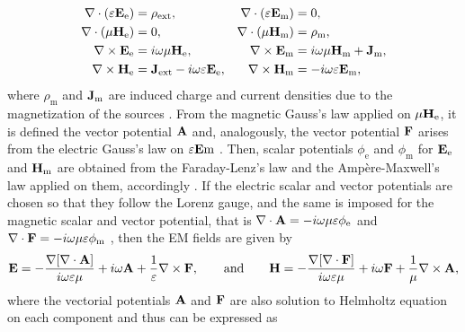 \begin{subequations}
    \label{eq:MaxwellsEq-em}
\begin{align}
    \nabla \cdot \qty(\varepsilon \vb{E}_\text{e})  &= \rho_\text{ext},
                    &\nabla \cdot \qty(\varepsilon \vb{E}_\text{m})  &= 0,\\
    \nabla \cdot  (\mu\vb{H}_\text{e})  &= 0,
                    & \nabla \cdot  (\mu\vb{H}_\text{m})  &= \rho_\text{m},\\
    \nabla \times \vb{E}_\text{e}  &= i\omega \mu \vb{H}_\text{e},
                    & \nabla \times \vb{E}_\text{m}  &= i\omega \mu \vb{H}_\text{m} + \vb{J}_\text{m},\\
    \nabla \times \vb{H}_\text{e}  &= \vb{J}_\text{ext} - i\omega \varepsilon \vb{E}_\text{e},
                & \nabla \times \vb{H}_\text{m}  &=- i\omega \varepsilon \vb{E}_\text{m},
\end{align}
\end{subequations}%
%
%
%
%
where $\rho_\text{m}$ and $\vb{J}_\text{m}$ are  induced charge and current densities due to the magnetization of the sources \cite{jin_theory_2010}. From the magnetic Gauss's law applied on $\mu\vb{H}_\text{e}$, it is defined the vector potential $\vb{A}$ and, analogously, the vector potential $\vb{F}$ arises from the electric Gauss's law on $\varepsilon\vb{E}\text{m}$ \cite{jin_theory_2010}. Then, scalar potentials $\phi_\text{e}$ and $\phi_\text{m}$ for $\vb{E}_\text{e} $ and $\vb{H}_\text{m}$ are obtained from the Faraday-Lenz's law and the Ampère-Maxwell's law applied on them, accordingly \cite{jin_theory_2010}. If the electric scalar and vector potentials are chosen so that they follow the Lorenz gauge, and the same is imposed for the magnetic scalar and vector potential, that is $\nabla\cdot\vb{A} = -i\omega\mu\varepsilon \phi_\text{e}$ and $\nabla\cdot\vb{F} = -i\omega\mu\varepsilon \phi_\text{m}$ \cite{zangwill_modern_2013}, then the EM fields are given by
%
\begin{align}
    \vb{E} = - \frac{\nabla[\nabla\cdot\vb{A}]}{i\omega\varepsilon\mu} + i \omega\vb{A} + \frac{1}{\varepsilon}\nabla\times\vb{F},
    \qquad
    \text{and}
    \qquad
    \vb{H} =- \frac{\nabla[\nabla\cdot\vb{F}]}{i\omega\varepsilon\mu} + i \omega\vb{F} + \frac{1}{\mu}\nabla\times\vb{A},
    \label{eq:EMFields}
\end{align}
%
where the vectorial potentials $\vb{A}$ and $\vb{F}$ are also solution to Helmholtz equation on each component and thus can be expressed as \cite{jin_theory_2010}
